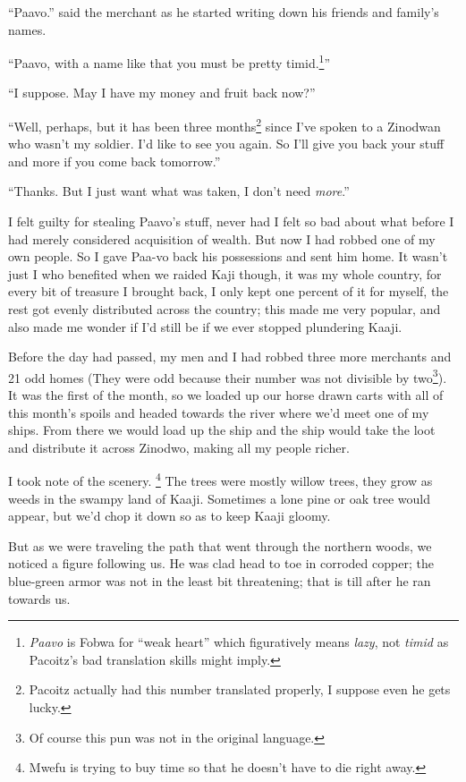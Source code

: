 ``Paa\-vo.'' said the merchant as he started writing down his friends and family's names.

``Paa\-vo, with a name like that you must be pretty timid.\footnote{\emph{Paa\-vo} is Fo\-bwa for ``weak heart'' which figuratively means \emph{lazy}, not \emph{timid} as Pa\-co\-itz's bad translation skills might imply.}''

``I suppose. May I have my money and fruit back now?''

``Well, perhaps, but it has been three months\footnote{Pa\-co\-itz actually had this number translated properly, I suppose even he gets lucky.} since I've spoken to a Zi\-no\-dwan who wasn't my soldier. I'd like to see you again. So I'll give you back your stuff and more if you come back tomorrow.''

``Thanks. But I just want what was taken, I don't need \emph{more}.''

I felt guilty for stealing Paa\-vo's stuff, never had I felt so bad about what before I had merely considered acquisition of wealth. But now I had robbed one of my own people. So I gave Paa-vo back his possessions and sent him home. It wasn't just I who benefited when we raided Ka\-ji though, it was my whole country, for every bit of treasure I brought back, I only kept one percent of it for myself, the rest got evenly distributed across the country; this made me very popular, and also made me wonder if I'd still be if we ever stopped plundering Kaa\-ji.

Before the day had passed, my men and I had robbed three more merchants and 21 odd homes (They were odd because their number was not divisible by two\footnote{Of course this pun was not in the original language.}).
It was the first of the month, so we loaded up our horse drawn carts with all of this month's spoils and headed towards the river where we'd meet one of my ships. From there we would load up the ship and the ship would take the loot and distribute it across Zi\-no\-dwo, making all my people richer.

I took note of the scenery. \footnote{Mwe\-fu is trying to buy time so that he doesn't have to die right away.}
The trees were mostly willow trees, they grow as weeds in the swampy land of Kaa\-ji. Sometimes a lone pine or oak tree would appear, but we'd chop it down so as to keep Kaa\-ji gloomy.

But as we were traveling the path that went through the northern woods, we noticed a figure following us. He was clad head to toe in corroded copper; the blue-green armor was not in the least bit threatening; that is till after he ran towards us.

